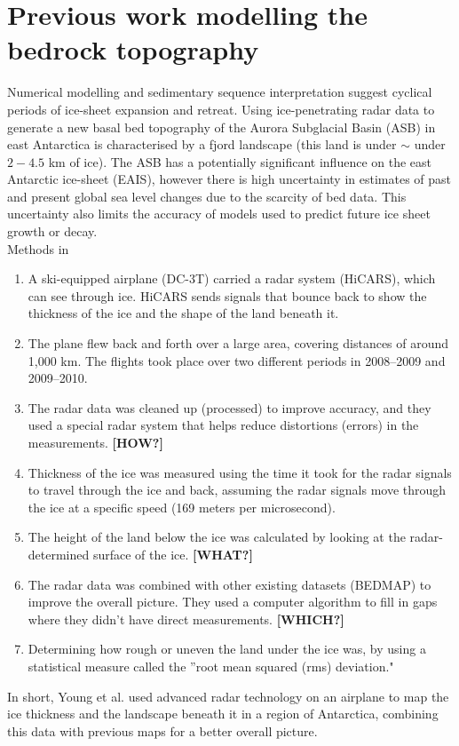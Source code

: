 \chapter{Previous work modelling the bedrock topography}\label{n1}
Numerical modelling and sedimentary sequence interpretation suggest cyclical periods of ice-sheet expansion and retreat\cite{Young2011}. Using ice-penetrating radar data to generate a new basal bed topography of the Aurora Subglacial Basin (ASB) in east Antarctica is characterised by a fjord landscape (this land is under $\sim$ under $2-4.5$ km of ice). The ASB has a potentially significant influence on the east Antarctic ice-sheet (EAIS), however there is high uncertainty in estimates of past and present global sea level changes due to the scarcity of bed data\cite{Young2011}. This uncertainty also limits the accuracy of models used to predict future ice sheet growth or decay.\\
{\large Methods in\cite{Young2011}}
\begin{enumerate}
    \item A ski-equipped airplane (DC-3T) carried a radar system (HiCARS), which can see through ice. HiCARS sends signals that bounce back to show the thickness of the ice and the shape of the land beneath it.
    \item The plane flew back and forth over a large area, covering distances of around 1,000 km. The flights took place over two different periods in 2008–2009 and 2009–2010.
    \item The radar data was cleaned up (processed) to improve accuracy, and they used a special radar system that helps reduce distortions (errors) in the measurements. \textbf{[HOW?]}
    \item Thickness of the ice was measured using the time it took for the radar signals to travel through the ice and back, assuming the radar signals move through the ice at a specific speed (169 meters per microsecond).
    \item The height of the land below the ice was calculated by looking at the radar-determined surface of the ice. \textbf{[WHAT?]}
    \item The radar data was combined with other existing datasets (BEDMAP) to improve the overall picture. They used a computer algorithm to fill in gaps where they didn’t have direct measurements. \textbf{[WHICH?]}
    \item Determining how rough or uneven the land under the ice was, by using a statistical measure called the ''root mean squared (rms) deviation."
\end{enumerate}
In short, Young et al. used advanced radar technology on an airplane to map the ice thickness and the landscape beneath it in a region of Antarctica, combining this data with previous maps for a better overall picture.

